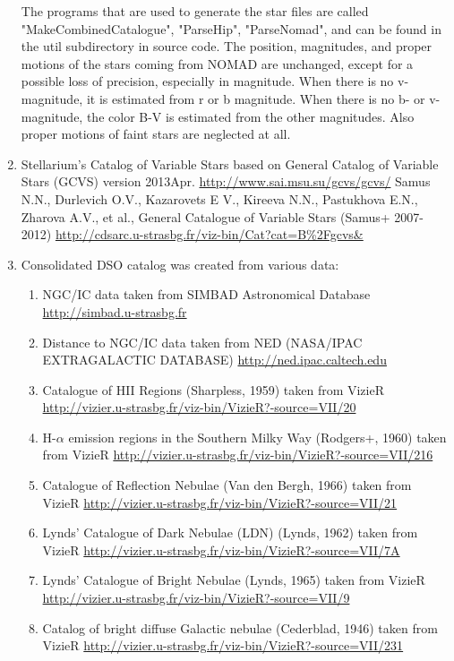 \begin{enumerate}
\begin{itemize}
	\end{itemize}
    The programs that are used to generate the star files are called
    "MakeCombinedCatalogue", "ParseHip", "ParseNomad", and can be
    found in the util subdirectory in source code. The position,
    magnitudes, and proper motions of the stars coming from NOMAD
    are unchanged, except for a possible loss of precision,
    especially in magnitude. When there is no v-magnitude, it is
    estimated from r or b magnitude.  When there is no b- or v-
    magnitude, the color B-V is estimated from the other magnitudes.
    Also proper motions of faint stars are neglected at all.
\item Stellarium's Catalog of Variable Stars based on General Catalog of Variable Stars (GCVS) version 2013Apr. \url{http://www.sai.msu.su/gcvs/gcvs/}
    Samus N.N., Durlevich O.V., Kazarovets E V., Kireeva N.N., Pastukhova E.N., Zharova A.V., et al., General Catalogue of Variable Stars (Samus+ 2007-2012)
    \url{http://cdsarc.u-strasbg.fr/viz-bin/Cat?cat=B%2Fgcvs&}
\item Consolidated DSO catalog was created from various data:
	\begin{enumerate}
     \item NGC/IC data taken from SIMBAD Astronomical Database \url{http://simbad.u-strasbg.fr}
     \item Distance to NGC/IC data taken from NED                (NASA/IPAC EXTRAGALACTIC DATABASE)  \url{http://ned.ipac.caltech.edu}
     \item Catalogue of HII Regions                              (Sharpless, 1959)     taken from VizieR \url{http://vizier.u-strasbg.fr/viz-bin/VizieR?-source=VII/20}
     \item H-$\alpha$ emission regions in the Southern Milky Way (Rodgers+, 1960)      taken from VizieR \url{http://vizier.u-strasbg.fr/viz-bin/VizieR?-source=VII/216}
     \item Catalogue of Reflection Nebulae                       (Van den Bergh, 1966) taken from VizieR \url{http://vizier.u-strasbg.fr/viz-bin/VizieR?-source=VII/21}
     \item Lynds' Catalogue of Dark Nebulae (LDN)                (Lynds, 1962)         taken from VizieR \url{http://vizier.u-strasbg.fr/viz-bin/VizieR?-source=VII/7A}
     \item Lynds' Catalogue of Bright Nebulae                    (Lynds, 1965)         taken from VizieR \url{http://vizier.u-strasbg.fr/viz-bin/VizieR?-source=VII/9}
     \item Catalog of bright diffuse Galactic nebulae            (Cederblad, 1946)     taken from VizieR \url{http://vizier.u-strasbg.fr/viz-bin/VizieR?-source=VII/231}

\end{enumerate}
\end{enumerate}
